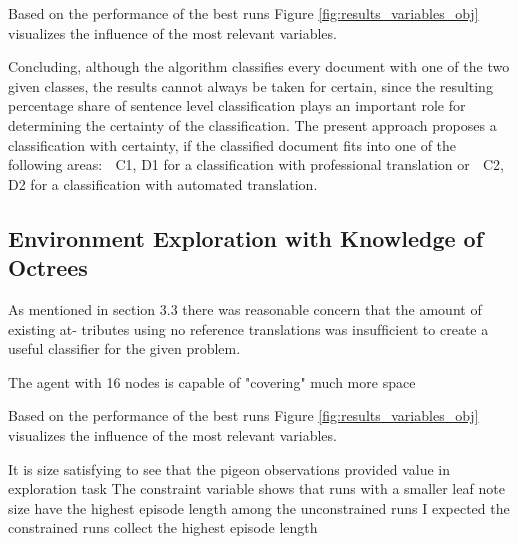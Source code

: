         Based on the performance of the best runs Figure \ref{fig:results_variables_obj} visualizes the influence of the most relevant variables.

        
        


        Concluding, although the algorithm classiﬁes every document with one of the two given
        classes, the results cannot always be taken for certain, since the resulting percentage share
        of sentence level classiﬁcation plays an important role for determining the certainty of
        the classiﬁcation. The present approach proposes a classiﬁcation with certainty, if the
        classiﬁed document ﬁts into one of the following areas:
         C1, D1 for a classiﬁcation with professional translation or
         C2, D2 for a classiﬁcation with automated translation.


    \subsection{Environment Exploration with Knowledge of Octrees}
        
        As mentioned in section 3.3 there was reasonable concern that the amount of existing at-
        tributes using no reference translations was insufﬁcient to create a useful classiﬁer for the
        given problem. 

        The agent with 16 nodes is capable of "covering" much more space 
               
     Based on the performance of the best runs Figure \ref{fig:results_variables_obj} visualizes the influence of the most relevant variables.

            It is size satisfying to see that the pigeon observations provided value in exploration task
        The constraint variable shows that runs with a smaller leaf note size have the highest episode length among the unconstrained runs
        I expected the constrained runs collect the highest episode length

        
